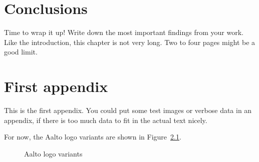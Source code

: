 \documentclass[12pt,a4paper,oneside,pdftex]{report}
\begin{document}
% 

\chapter{Conclusions}
\label{chapter:conclusions}

Time to wrap it up!
Write down the most important findings from your work.
Like the introduction, this chapter is not very long.
Two to four pages might be a good limit.



% 



\appendix
% 

\chapter{First appendix}
\label{chapter:first-appendix}

This is the first appendix. You could put some test images or verbose data in an
appendix, if there is too much data to fit in the actual text nicely.

For now, the Aalto logo variants are shown in Figure~\ref{fig:aaltologo}.

\begin{figure}
\begin{center}
\caption{Aalto logo variants}
\label{fig:aaltologo}
\end{center}
\end{figure}


\end{document}
